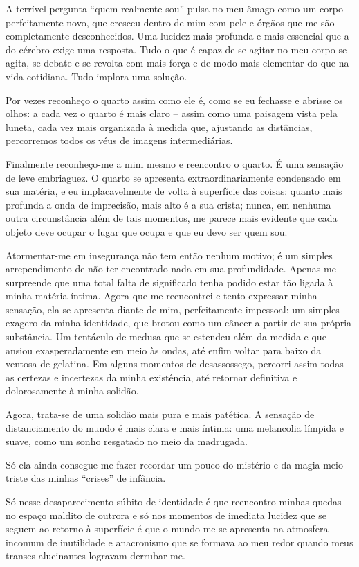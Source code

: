 A terrível pergunta ``quem realmente sou'' pulsa no meu âmago como um corpo perfeitamente novo, que cresceu dentro de mim com pele e órgãos que me são completamente desconhecidos. Uma lucidez mais profunda e mais essencial que a do cérebro exige uma resposta. Tudo o que é capaz de se agitar no meu corpo se agita, se debate e se revolta com mais força e de modo mais elementar do que na vida cotidiana. Tudo implora uma solução.

Por vezes reconheço o quarto assim como ele é, como se eu fechasse e abrisse os olhos: a cada vez o quarto é mais claro -- assim como uma paisagem vista pela luneta, cada vez mais organizada à medida que, ajustando as distâncias, percorremos todos os véus de imagens intermediárias.

Finalmente reconheço-me a mim mesmo e reencontro o quarto. É uma sensação de leve embriaguez. O quarto se apresenta extraordinariamente condensado em sua matéria, e eu implacavelmente de volta à superfície das coisas: quanto mais profunda a onda de imprecisão, mais alto é a sua crista; nunca, em nenhuma outra circunstância além de tais momentos, me parece mais evidente que cada objeto deve ocupar o lugar que ocupa e que eu devo ser quem sou.

Atormentar-me em insegurança não tem então nenhum motivo; é um simples arrependimento de não ter encontrado nada em sua profundidade. Apenas me surpreende que uma total falta de significado tenha podido estar tão ligada à minha matéria íntima. Agora que me reencontrei e tento expressar minha sensação, ela se apresenta diante de mim, perfeitamente impessoal: um simples exagero da minha identidade, que brotou como um câncer a partir de sua própria substância. Um tentáculo de medusa que se estendeu além da medida e que ansiou exasperadamente em meio às ondas, até enfim voltar para baixo da ventosa de gelatina. Em alguns momentos de desassossego, percorri assim todas as certezas e incertezas da minha existência, até retornar definitiva e dolorosamente à minha solidão.

Agora, trata-se de uma solidão mais pura e mais patética. A sensação de distanciamento do mundo é mais clara e mais íntima: uma melancolia límpida e suave, como um sonho resgatado no meio da madrugada.

Só ela ainda consegue me fazer recordar um pouco do mistério e da magia meio triste das minhas ``crises'' de infância.

Só nesse desaparecimento súbito de identidade é que reencontro minhas quedas no espaço maldito de outrora e só nos momentos de imediata lucidez que se seguem ao retorno à superfície é que o mundo me se apresenta na atmosfera incomum de inutilidade e anacronismo que se formava ao meu redor quando meus transes alucinantes logravam derrubar-me.


